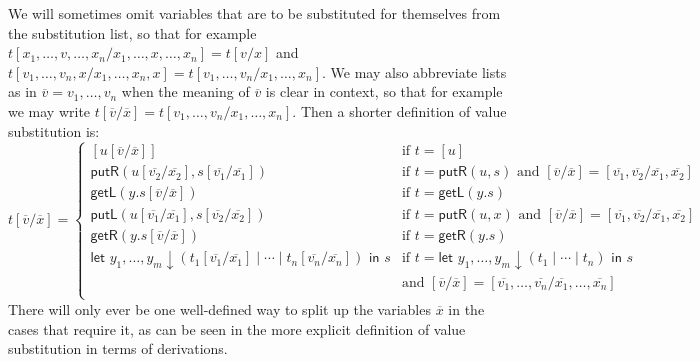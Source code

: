 \documentclass[twoside,11pt,final]{entics}
\newcommand{\getl}{\mathsf{getL}}
\newcommand{\putr}{\mathsf{putR}}
\newcommand{\getr}{\mathsf{getR}}
\newcommand{\putl}{\mathsf{putL}}
\newcommand{\asn}{\downarrow}
\newcommand{\seq}{,\!\ldots\!,}
\begin{document}
  We will sometimes omit variables that are to be substituted for themselves from the substitution list, so that for example $t[x_1\seq v \seq x_n / x_1 \seq x \seq x_n] = t[v/x]$ and $t[v_1 \seq v_n,x / x_1 \seq x_n,x] = t[v_1\seq v_n/x_1 \seq x_n]$. We may also abbreviate lists as in $\overline{v} = v_1\seq v_n$ when the meaning of $\overline{v}$ is clear in context, so that for example we may write $t[\overline{v}/\overline{x}] = t[v_1\seq v_n/x_1 \seq x_n]$. Then a shorter definition of value substitution is:
  \[
    t[\overline{v}/\overline{x}] =
    \begin{cases}
      [u[\overline{v}/\overline{x}]] &\text{if } t = [u]\\
      \putr(u[\overline{v_2}/\overline{x_2}],s[\overline{v_1}/\overline{x_1}]) &\text{if } t = \putr(u,s) \text{ and } [\overline{v}/\overline{x}] = [\overline{v_1},\overline{v_2}/\overline{x_1},\overline{x_2}]\\
      \getl(y.s[\overline{v}/\overline{x}]) &\text{if } t = \getl(y.s)\\
      \putl(u[\overline{v_1}/\overline{x_1}],s[\overline{v_2}/\overline{x_2}]) &\text{if } t = \putr(u,x) \text{ and } [\overline{v}/\overline{x}] = [\overline{v_1},\overline{v_2}/\overline{x_1},\overline{x_2}]\\
      \getr(y.s[\overline{v}/\overline{x}]) &\text{if } t = \getr(y.s)\\
      \textsf{let } y_1 \seq y_m \asn (t_1[\overline{v_1}/\overline{x_1}] \mid \cdots \mid t_n[\overline{v_n}/\overline{x_n}]) \textsf{ in } s &\text{if } t = \textsf{let } y_1 \seq y_m \asn (t_1 \mid \cdots \mid t_n) \textsf{ in } s \\&\text{and } [\overline{v} / \overline{x}] = [\overline{v_1} \seq \overline{v_n}/\overline{x_1}\seq \overline{x_n}]\\
    \end{cases}
  \]
  There will only ever be one well-defined way to split up the variables $\overline{x}$ in the cases that require it, as can be seen in the more explicit definition of value substitution in terms of derivations.
\end{document}
